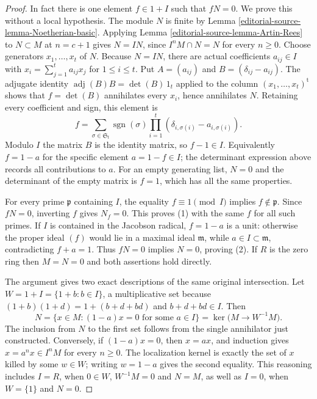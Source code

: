 \begin{proof}
In fact there is one element $f\in1+I$ such that $fN=0$.
We prove this without a local hypothesis. The module $N$ is finite
by Lemma \ref{editorial-source-lemma-Noetherian-basic}. Applying
Lemma \ref{editorial-source-lemma-Artin-Rees} to $N\subset M$ at $n=c+1$
gives $N=IN$, since $I^nM\cap N=N$ for every $n\geq0$.
Choose generators $x_1,\ldots,x_t$ of $N$. Because $N=IN$,
there are actual coefficients $a_{ij}\in I$ with
$x_i=\sum_{j=1}^t a_{ij}x_j$ for $1\leq i\leq t$.
Put $A=(a_{ij})$ and $B=(\delta_{ij}-a_{ij})$.
The adjugate identity $\operatorname{adj}(B)B=\det(B)\,1_t$
applied to the column $(x_1,\ldots,x_t)^{\mathrm t}$ shows
that $f=\det(B)$ annihilates every $x_i$, hence annihilates $N$.
Retaining every coefficient and sign, this element is
$$
f=\sum_{\sigma\in\mathfrak S_t}\operatorname{sgn}(\sigma)
       \prod_{i=1}^t(\delta_{i,\sigma(i)}-a_{i,\sigma(i)}).
$$
Modulo $I$ the matrix $B$ is the identity matrix, so $f-1\in I$.
Equivalently $f=1-a$ for the specific element $a=1-f\in I$;
the determinant expression above records all contributions to $a$.
For an empty generating list, $N=0$ and the determinant of the
empty matrix is $f=1$, which has all the same properties.

For every prime $\mathfrak p$ containing $I$, the equality
$f\equiv1\pmod I$ implies $f\notin\mathfrak p$.
Since $fN=0$, inverting $f$ gives $N_f=0$. This proves (1)
with the same $f$ for all such primes. If $I$ is contained in the
Jacobson radical, $f=1-a$ is a unit: otherwise the proper ideal
$(f)$ would lie in a maximal ideal $\mathfrak m$, while
$a\in I\subset\mathfrak m$, contradicting $f+a=1$.
Thus $fN=0$ implies $N=0$, proving (2). If $R$ is the zero
ring then $M=N=0$ and both assertions hold directly.

The argument gives two exact descriptions of the same original
intersection. Let $W=1+I=\{1+b:b\in I\}$, a multiplicative
set because $(1+b)(1+d)=1+(b+d+bd)$ and $b+d+bd\in I$.
Then
$$
N=\{x\in M:(1-a)x=0\text{ for some }a\in I\}
=\ker\bigl(M\longrightarrow W^{-1}M\bigr).
$$
The inclusion from $N$ to the first set follows from the single
annihilator just constructed. Conversely, if $(1-a)x=0$,
then $x=ax$, and induction gives $x=a^nx\in I^nM$ for
every $n\geq0$. The localization kernel is exactly the set of
$x$ killed by some $w\in W$; writing $w=1-a$ gives the
second equality. This reasoning includes $I=R$, when $0\in W$,
$W^{-1}M=0$ and $N=M$, as well as $I=0$, when $W=\{1\}$
and $N=0$.


\end{proof}
